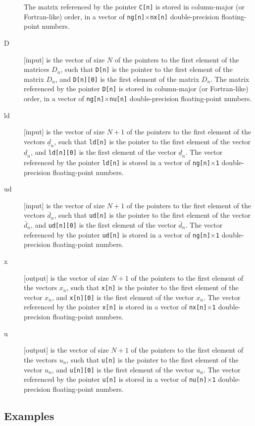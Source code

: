 \documentclass{report}
\begin{document}
\begin{description}
The matrix referenced by the pointer {\tt C[n]} is stored in column-major (or Fortran-like) order, in a vector of {\tt ng[n]$\times$nx[n]} double-precision floating-point numbers.
\item[D] [input] is the vector of size $N$ of the pointers to the first element of the matrices $D_n$, such that {\tt D[n]} is the pointer to the first element of the matrix $D_n$, and {\tt D[n][0]} is the first element of the matrix $D_n$.
The matrix referenced by the pointer {\tt D[n]} is stored in column-major (or Fortran-like) order, in a vector of {\tt ng[n]$\times$nu[n]} double-precision floating-point numbers.
\item[ld] [input] is the vector of size $N+1$ of the pointers to the first element of the vectors $\underline d_n$, such that {\tt ld[n]} is the pointer to the first element of the vector $\underline d_n$, and {\tt ld[n][0]} is the first element of the vector $\underline d_n$.
The vector referenced by the pointer {\tt ld[n]} is stored in a vector of {\tt ng[n]$\times$1} double-precision floating-point numbers.
\item[ud] [input] is the vector of size $N+1$ of the pointers to the first element of the vectors $\overline d_n$, such that {\tt ud[n]} is the pointer to the first element of the vector $\overline d_n$, and {\tt ud[n][0]} is the first element of the vector $\overline d_n$.
The vector referenced by the pointer {\tt ud[n]} is stored in a vector of {\tt ng[n]$\times$1} double-precision floating-point numbers.
\item[x] [output] is the vector of size $N+1$ of the pointers to the first element of the vectors $x_n$, such that {\tt x[n]} is the pointer to the first element of the vector $x_n$, and {\tt x[n][0]} is the first element of the vector $x_n$.
The vector referenced by the pointer {\tt x[n]} is stored in a vector of {\tt nx[n]$\times$1} double-precision floating-point numbers.
\item[u] [output] is the vector of size $N+1$ of the pointers to the first element of the vectors $u_n$, such that {\tt u[n]} is the pointer to the first element of the vector $u_n$, and {\tt u[n][0]} is the first element of the vector $u_n$.
The vector referenced by the pointer {\tt u[n]} is stored in a vector of {\tt nu[n]$\times$1} double-precision floating-point numbers.
\end{description}

\subsection{Examples}
\end{document}
